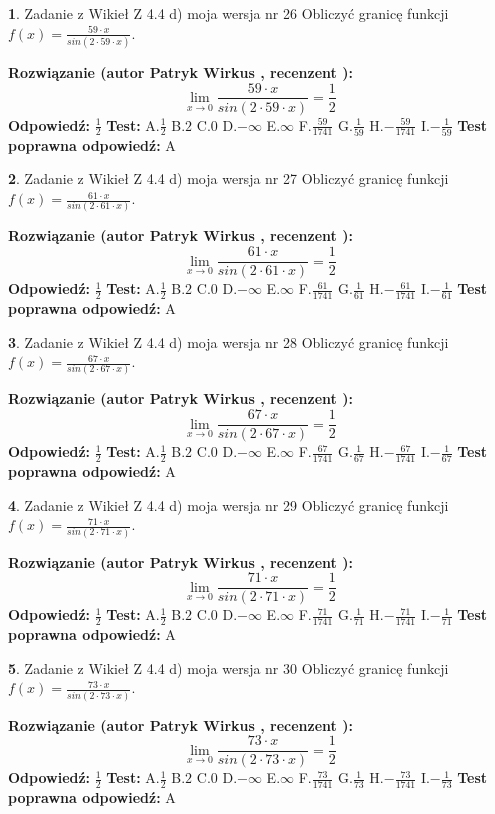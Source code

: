 \documentclass[12pt, a4paper]{article}
\theoremstyle{definition} %
\newtheorem{zad}{}
\newcommand{\zadStart}[1]{\begin{zad}#1\newline}
\newcommand{\zadStop}{\end{zad}}
\newcommand{\rozwStart}[2]{\noindent \textbf{Rozwiązanie (autor #1 , recenzent #2): }\newline}
\newcommand{\rozwStop}{\newline}
\newcommand{\odpStart}{\noindent \textbf{Odpowiedź:}\newline}
\newcommand{\odpStop}{\newline}
\newcommand{\testStart}{\noindent \textbf{Test:}\newline}
\newcommand{\testStop}{\newline}
\newcommand{\kluczStart}{\noindent \textbf{Test poprawna odpowiedź:}\newline}
\newcommand{\kluczStop}{\newline}
\begin{document}
\zadStart{Zadanie z Wikieł Z 4.4 d) moja wersja nr 26}
Obliczyć granicę funkcji $f(x)=\frac{59\cdot x}{sin(2 \cdot59\cdot x)}$.
\zadStop
\rozwStart{Patryk Wirkus}{}
$$\lim\limits_{x\to 0}\frac{59\cdot x}{sin(2 \cdot59\cdot x)}=\frac{1}{2}$$
\rozwStop
\odpStart
$\frac{1}{2}$
\odpStop
\testStart
A.$\frac{1}{2}$
B.$2$
C.$0$
D.$-\infty$
E.$\infty$
F.$\frac{59}{1741}$
G.$\frac{1}{59}$
H.$-\frac{59}{1741}$
I.$-\frac{1}{59}$
\testStop
\kluczStart
A
\kluczStop



\zadStart{Zadanie z Wikieł Z 4.4 d) moja wersja nr 27}
Obliczyć granicę funkcji $f(x)=\frac{61\cdot x}{sin(2 \cdot61\cdot x)}$.
\zadStop
\rozwStart{Patryk Wirkus}{}
$$\lim\limits_{x\to 0}\frac{61\cdot x}{sin(2 \cdot61\cdot x)}=\frac{1}{2}$$
\rozwStop
\odpStart
$\frac{1}{2}$
\odpStop
\testStart
A.$\frac{1}{2}$
B.$2$
C.$0$
D.$-\infty$
E.$\infty$
F.$\frac{61}{1741}$
G.$\frac{1}{61}$
H.$-\frac{61}{1741}$
I.$-\frac{1}{61}$
\testStop
\kluczStart
A
\kluczStop



\zadStart{Zadanie z Wikieł Z 4.4 d) moja wersja nr 28}
Obliczyć granicę funkcji $f(x)=\frac{67\cdot x}{sin(2 \cdot67\cdot x)}$.
\zadStop
\rozwStart{Patryk Wirkus}{}
$$\lim\limits_{x\to 0}\frac{67\cdot x}{sin(2 \cdot67\cdot x)}=\frac{1}{2}$$
\rozwStop
\odpStart
$\frac{1}{2}$
\odpStop
\testStart
A.$\frac{1}{2}$
B.$2$
C.$0$
D.$-\infty$
E.$\infty$
F.$\frac{67}{1741}$
G.$\frac{1}{67}$
H.$-\frac{67}{1741}$
I.$-\frac{1}{67}$
\testStop
\kluczStart
A
\kluczStop



\zadStart{Zadanie z Wikieł Z 4.4 d) moja wersja nr 29}
Obliczyć granicę funkcji $f(x)=\frac{71\cdot x}{sin(2 \cdot71\cdot x)}$.
\zadStop
\rozwStart{Patryk Wirkus}{}
$$\lim\limits_{x\to 0}\frac{71\cdot x}{sin(2 \cdot71\cdot x)}=\frac{1}{2}$$
\rozwStop
\odpStart
$\frac{1}{2}$
\odpStop
\testStart
A.$\frac{1}{2}$
B.$2$
C.$0$
D.$-\infty$
E.$\infty$
F.$\frac{71}{1741}$
G.$\frac{1}{71}$
H.$-\frac{71}{1741}$
I.$-\frac{1}{71}$
\testStop
\kluczStart
A
\kluczStop



\zadStart{Zadanie z Wikieł Z 4.4 d) moja wersja nr 30}
Obliczyć granicę funkcji $f(x)=\frac{73\cdot x}{sin(2 \cdot73\cdot x)}$.
\zadStop
\rozwStart{Patryk Wirkus}{}
$$\lim\limits_{x\to 0}\frac{73\cdot x}{sin(2 \cdot73\cdot x)}=\frac{1}{2}$$
\rozwStop
\odpStart
$\frac{1}{2}$
\odpStop
\testStart
A.$\frac{1}{2}$
B.$2$
C.$0$
D.$-\infty$
E.$\infty$
F.$\frac{73}{1741}$
G.$\frac{1}{73}$
H.$-\frac{73}{1741}$
I.$-\frac{1}{73}$
\testStop
\kluczStart
A
\kluczStop
\end{document}
